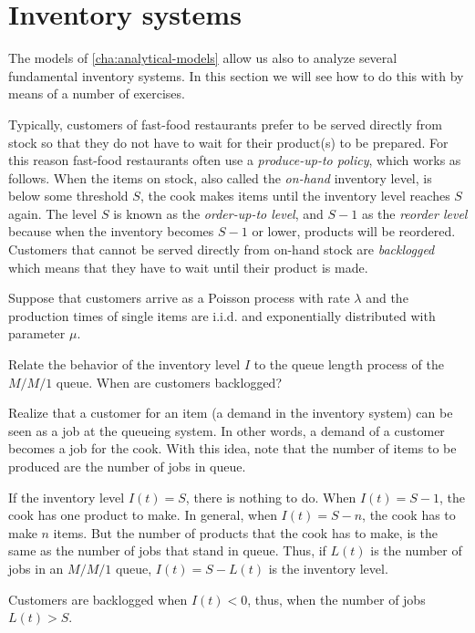 \section{Inventory systems}

The models of \cref{cha:analytical-models} allow us also to analyze several fundamental inventory systems.
In this section we will see how to do this with by means of a number of exercises. 





\begin{exercise} 

Typically, customers of fast-food restaurants prefer to be served directly from stock so that they do not have to wait for their product(s) to be prepared.
For this reason fast-food restaurants often use a \emph{produce-up-to policy}, which works as follows.
When the items on stock, also called the \emph{on-hand} inventory level, is below some threshold $S$, the cook makes items until the inventory level reaches $S$ again.
The level $S$ is known as the \emph{order-up-to level}, and $S-1$ as the \emph{reorder level} because when the inventory becomes $S-1$ or lower, products will be reordered.
Customers that cannot be served directly from on-hand stock are \emph{backlogged} which means that they have to wait until their product is made.

Suppose that customers arrive as a Poisson process with rate $\lambda$ and the production times of single items are i.i.d.
and exponentially distributed with parameter $\mu$.

Relate the behavior of the inventory level $I$ to the queue length process of the $M/M/1$ queue. When are customers backlogged? 

\begin{hint}
 Realize that a customer for an item (a demand in the inventory system) can be seen as a job at the queueing system.
 In other words, a demand of a customer becomes a job for the cook.
 With this idea, note that the number of items to be produced are the number of jobs in queue.
\end{hint}

\begin{solution}
 If the inventory level $I(t)=S$, there is nothing to do.
 When $I(t)=S-1$, the cook has one product to make.
 In general, when $I(t)=S-n$, the cook has to make $n$ items.
 But the number of products that the cook has to make, is the same as the number of jobs that stand in queue.
 Thus, if $L(t)$ is the number of jobs in an $M/M/1$ queue, $I(t) = S-L(t)$ is the inventory level.

Customers are backlogged when $I(t)<0$, thus, when the number of jobs $L(t) > S$. 

\end{solution}
\end{exercise}




